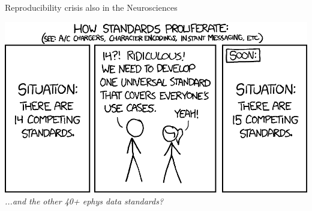 \documentclass[pdftex]{beamer}
\begin{document}
\begin{frame}{Reproducibility crisis also in the Neurosciences}
    \begin{center}
        \includegraphics[width=0.75\columnwidth]{resources/standards}\\
        \vspace{1ex}
        \textit{...and the other 40+ ephys data standards?}
    \end{center}
\end{frame}
\end{document}
